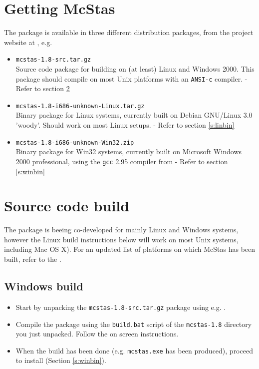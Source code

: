 \section{Getting McStas}
\label{s:obtain}
The  package is
available in three different distribution packages, from the project
website at
, e.g.
\begin{itemize}
\item{\texttt{mcstas-1.8-src.tar.gz}\\Source code package for
    building  on
    (at least) Linux and Windows 2000. This package should compile on
    most Unix platforms with an \texttt{ANSI-c} compiler. - Refer to section \ref{s:src}}
\item{\texttt{mcstas-1.8-i686-unknown-Linux.tar.gz}\\Binary package
  for Linux systems, currently built on Debian GNU/Linux 3.0 'woody'.
  Should work on most Linux setups.
 - Refer to section \ref{s:linbin}}
\item{\texttt{mcstas-1.8-i686-unknown-Win32.zip}\\Binary package
  for Win32 systems, currently built on Microsoft Windows 2000
  professional, using the \texttt{gcc} 2.95 compiler from
   - Refer to section \ref{s:winbin}}
\end{itemize}

\section{Source code build}
\label{s:src}
The  package is
beeing co-developed for mainly Linux and Windows systems, however
the Linux build instructions below will work on most Unix
systems, including Mac OS X). For an updated list of platforms on which McStas has been
built, refer to the .

\subsection{Windows build}
\begin{itemize}
\item{Start by unpacking the \texttt{mcstas-1.8-src.tar.gz} package using
e.g. .}
\item{Compile the  package using the \texttt{build.bat} script of the
\texttt{mcstas-1.8} directory you just unpacked. Follow the on screen
instructions.}
\item{When the build has been done (e.g. \texttt{mcstas.exe}
has been produced), proceed to install (Section \ref{s:winbin}).}
\end{itemize}

